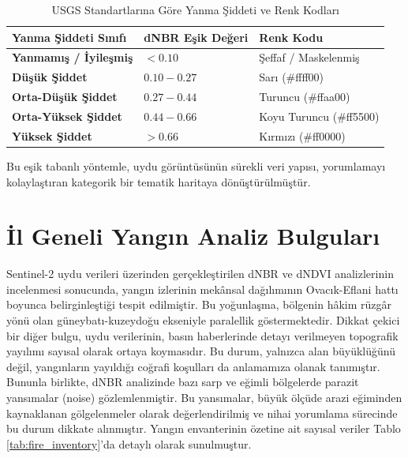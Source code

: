 \documentclass[11pt,a4paper]{article}
\begin{document}
\begin{table}[H]
    \centering
    \caption{USGS Standartlarına Göre Yanma Şiddeti ve Renk Kodları}
    \label{tab:dnbr_legend}
    \begin{tabular}{@{}lll@{}}
    \toprule
    \textbf{Yanma Şiddeti Sınıfı} & \textbf{dNBR Eşik Değeri} & \textbf{Renk Kodu} \\ \midrule
    \textbf{Yanmamış / İyileşmiş} & $< 0.10$ & Şeffaf / Maskelenmiş \\
    \textbf{Düşük Şiddet} & $0.10 - 0.27$ & Sarı (\#ffff00) \\
    \textbf{Orta-Düşük Şiddet} & $0.27 - 0.44$ & Turuncu (\#ffaa00) \\
    \textbf{Orta-Yüksek Şiddet} & $0.44 - 0.66$ & Koyu Turuncu (\#ff5500) \\
    \textbf{Yüksek Şiddet} & $> 0.66$ & Kırmızı (\#ff0000) \\ \bottomrule
    \end{tabular}
\end{table}

Bu eşik tabanlı yöntemle, uydu görüntüsünün sürekli veri yapısı, yorumlamayı kolaylaştıran kategorik bir tematik haritaya dönüştürülmüştür.

\clearpage

\section{İl Geneli Yangın Analiz Bulguları}

Sentinel-2 uydu verileri üzerinden gerçekleştirilen dNBR ve dNDVI analizlerinin incelenmesi sonucunda, yangın izlerinin mekânsal dağılımının Ovacık-Eflani hattı boyunca belirginleştiği tespit edilmiştir. 
Bu yoğunlaşma, bölgenin hâkim rüzgâr yönü olan güneybatı-kuzeydoğu ekseniyle paralellik göstermektedir.
Dikkat çekici bir diğer bulgu, uydu verilerinin, basın haberlerinde detayı verilmeyen topografik yayılımı sayısal olarak ortaya koymasıdır. 
Bu durum, yalnızca alan büyüklüğünü değil, yangınların yayıldığı coğrafi koşulları da anlamamıza olanak tanımıştır. 
Bununla birlikte, dNBR analizinde bazı sarp ve eğimli bölgelerde parazit yansımalar (noise) gözlemlenmiştir. 
Bu yansımalar, büyük ölçüde arazi eğiminden kaynaklanan gölgelenmeler olarak değerlendirilmiş ve nihai yorumlama sürecinde bu durum dikkate alınmıştır. 
Yangın envanterinin özetine ait sayısal veriler Tablo \ref{tab:fire_inventory}'da detaylı olarak sunulmuştur.
\end{document}

